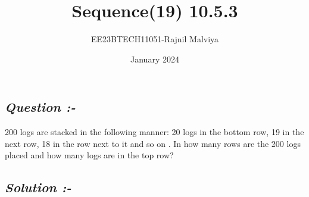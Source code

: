 \documentclass[journal,12pt,twocolumn]{IEEEtran}
\theoremstyle{remark}
\begin{document}
\title{Sequence(19) 10.5.3}
\author{EE23BTECH11051-Rajnil Malviya}
\date{January 2024}
\maketitle
\subsection*{\textit{Question :-}}
200 logs are stacked in the following manner: 20 logs in the bottom row, 19 in the next row,
18 in the row next to it and so on . In how many rows are the 200 logs placed
and how many logs are in the top row?
\begin{table}[h!]
   
        
       
    \end{table}
\subsection*{\textit{Solution :-}}
\end{document}
